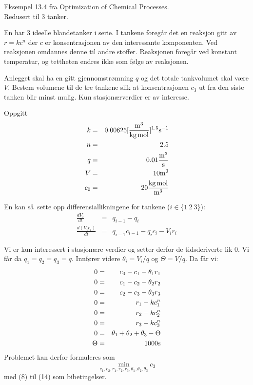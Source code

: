  
 
{\Large Eksempel 13.4 fra Optimization of Chemical Processes.}\\ 
  Redusert til 3 tanker. 
 
En har 3 ideelle blandetanker i serie.  I tankene foreg\aa r det 
en reaksjon gitt av $r = k c^{n}$ der $c$ er konsentrasjonen av den 
interessante komponenten.  Ved reaksjonen omdannes denne til andre 
stoffer.  Reaksjonen foreg\aa r ved konstant temperatur, og tettheten 
endres ikke som f\o lge av reaksjonen. 
 
Anlegget skal ha en gitt gjennomstr\o mning $q$ og det totale  
tank\-volumet skal v\ae re $V$.  Bestem volumene til de tre tankene 
slik at konsentrasjonen $c_{3}$ ut fra den siste tanken blir minst mulig. 
Kun stasjon\ae r\-verdier er av 
interesse. 
 
 
Oppgitt 
\begin{eqnarray} 
k & = & 0.00625 {\rm [ \frac{m^{3}}{kg \, mol} ]^{1.5} s^{-1}} \\ 
n & = & 2.5 \\ 
q & = & 0.01 {\rm \frac{m^{3}}{s}} \\ 
V & = & 10 {\rm m^{3}} \\ 
c_{0} & = & 20 {\rm \frac{kg \, mol}{m^{3}}} 
\end{eqnarray} 
 
En kan s\aa\ sette opp differensiallikningene for tankene ($i \in \{1\:2\:3\}$): 
\begin{eqnarray} 
\frac{dV_{i}}{dt} & = & q_{i-1} - q_{i} \\ 
\frac{d(V_{i}c_{i})}{dt} & = & q_{i-1}c_{i-1} - q_{i}c_{i} - V_{i}r_{i}  
\end{eqnarray} 
 
Vi er kun interessert i stasjon\ae re verdier og setter derfor de tidsderiverte 
lik 0.  Vi f\aa r da $q_{1}=q_{2}=q_{3}=q$.  Innf\o rer videre $\theta_{i} = 
V_{i}/q$ og $\Theta = V/q$.  Da f\aa r vi: 
\begin{eqnarray} 
0 & = & c_{0} - c_{1} - \theta_{1}r_{1} \\ 
0 & = & c_{1} - c_{2} - \theta_{2}r_{2} \\ 
0 & = & c_{2} - c_{3} - \theta_{3}r_{3} \\ 
0 & = & r_{1} - k c_{1}^{n} \\ 
0 & = & r_{2} - k c_{2}^{n} \\ 
0 & = & r_{3} - k c_{3}^{n} \\ 
0 & = & \theta_{1} + \theta_{2} + \theta_{3} - \Theta \\ 
\Theta & = & 1000 {\rm s} 
\end{eqnarray} 
Problemet kan derfor formuleres som 
\begin{equation} 
\min_{c_{1},c_{2},r_{1},r_{2},r_{3},\theta_{1},\theta_{2},\theta_{3}} c_{3} 
\end{equation} 
med (8) til (14) som bibetingelser. 
 
